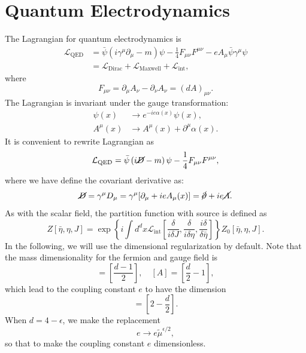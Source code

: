 \chapter{Quantum Electrodynamics}

The Lagrangian for quantum electrodynamics is
\begin{equation}
\begin{aligned}
	\mathcal{L}_{\mathrm{QED}}
	&= \bar\psi \left(i\gamma^\mu \partial_\mu - m\right)\psi - \frac{1}{4}F_{\mu\nu}F^{\mu\nu} -eA_\mu \bar\psi\gamma^\mu  \psi \\
	&= \mathcal{L}_{\mathrm{Dirac}}+\mathcal{L}_{\mathrm{Maxwell}}+\mathcal{L}_{\mathrm{int}},
\end{aligned}
\end{equation}
where
\begin{equation}
	F_{\mu\nu} = \partial_\mu A_\nu - \partial_\nu A_\nu = (dA)_{\mu\nu}.
\end{equation}
The Lagrangian is invariant under the gauge transformation:
\begin{equation}
\begin{aligned}
	\psi(x) &\rightarrow e^{-ie\alpha(x)}\psi(x), \\
	A^\mu(x) &\rightarrow A^\mu(x) + \partial^\mu \alpha(x).
\end{aligned}
\end{equation}
It is convenient to rewrite Lagrangian as
\begin{equation}
	\mathcal{L}_{\mathrm{QED}}
	= \bar\psi \left(i\cancel{D} - m\right)\psi - \frac{1}{4}F_{\mu\nu}F^{\mu\nu},
\end{equation}
where we have define the covariant derivative as:
\begin{equation}
	\cancel{D} = \gamma^\mu D_\mu 
	= \gamma^\mu [\partial_\mu + i e A_\mu(x)]
	= \cancel{\partial} + ie \cancel{A}.
\end{equation}
As with the scalar field, the partition function with source is defined as
\begin{equation}
	Z[\bar\eta,\eta,J] = \exp\left\{i\int d^dx \mathcal{L}_{\mathrm{int}}\left[\frac{\delta}{i\delta J},\frac{\delta}{i\delta \eta},\frac{i\delta}{\delta \bar\eta}\right]\right\} Z_0[\bar\eta,\eta,J].
\end{equation}
In the following, we will use the dimensional regularization by default. 
Note that the mass dimensionality for the fermion and gauge field is
\begin{equation*}
	[\psi] = \left[\frac{d-1}{2}\right],\quad
	[A] = \left[\frac{d}{2}-1\right],
\end{equation*}
which lead to the coupling constant $e$ to have the dimension
\begin{equation*}
	[e] = \left[2-\frac{d}{2} \right].
\end{equation*}
When $d=4-\epsilon$, we make the replacement
\begin{equation*}
	e \rightarrow e \tilde{\mu}^{\epsilon/2},
\end{equation*}
so that to make the coupling constant $e$ dimensionless.



